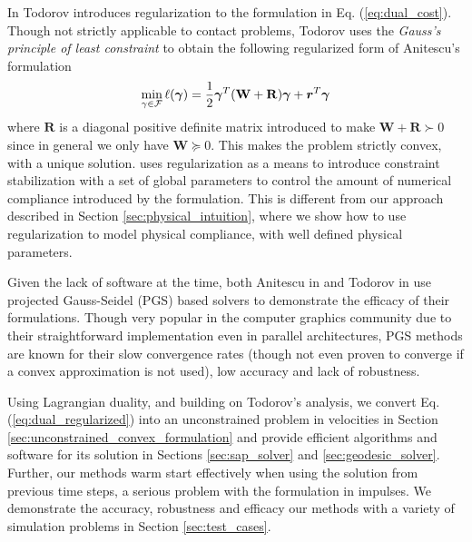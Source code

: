 In \cite{bib:todorov2011, bib:todorov2014} Todorov introduces regularization to
the formulation in Eq. (\ref{eq:dual_cost}). Though not strictly applicable to
contact problems, Todorov uses the \emph{Gauss's principle of least
constraint} to obtain the following regularized form of Anitescu's formulation
\begin{eqnarray}
	\min_{\gamma\in \mathcal{F}} \ell(\bgamma) =
	\frac{1}{2}\bgamma^T(\mathbf{W}+\mathbf{R})\bgamma + {\bm r}^T
	\bgamma
	\label{eq:dual_regularized}
\end{eqnarray}
where $\mathbf{R}$ is a diagonal positive definite matrix introduced to
make $\mathbf{W}+\mathbf{R}\succ 0$ since in general we only have $\mathbf{W}
\succeq 0$. This makes the problem strictly convex, with a unique solution.
\cite{bib:todorov2014} uses regularization as a means to introduce constraint
stabilization with a set of global parameters to control the amount of numerical
compliance introduced by the formulation. This is different from our approach
described in Section \ref{sec:physical_intuition}, where we show how to use
regularization to model physical compliance, with well defined physical
parameters.

Given the lack of software at the time, both Anitescu in \cite{bib:anitescu2010}
and Todorov in \cite{bib:todorov2014} use projected Gauss-Seidel (PGS) based
solvers to demonstrate the efficacy of their formulations. Though very popular
in the computer graphics community due to their straightforward implementation
even in parallel architectures, PGS methods are known for their slow convergence
rates (though not even proven to converge if a convex approximation is not
used), low accuracy and lack of robustness.

Using Lagrangian duality, and building on Todorov's analysis, we convert Eq.
(\ref{eq:dual_regularized}) into an unconstrained problem in velocities in
Section \ref{sec:unconstrained_convex_formulation} and
provide efficient algorithms and software for its solution in Sections
\ref{sec:sap_solver} and \ref{sec:geodesic_solver}. Further, our methods warm
start effectively when using the solution from previous time steps, a serious
problem with the formulation in impulses. We demonstrate the accuracy,
robustness and efficacy our methods with a variety of simulation problems in
Section \ref{sec:test_cases}.
